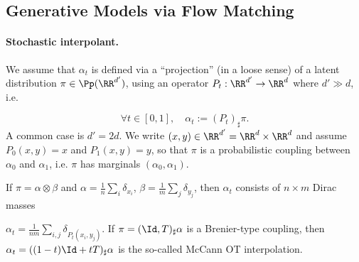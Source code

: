 \subsection{Generative Models via Flow Matching}
\paragraph{Stochastic interpolant.}
We assume that $\alpha_t$ is defined via a ``projection'' (in a loose sense) of a latent distribution $\pi \in \Pp(\RR^{d'})$, using an operator $P_t: \RR^{d'} \to \RR^d$ where $d' \gg d$, i.e.

\begin{equation}\label{eq:interp-coupling}
\forall t \in [0,1], \quad \alpha_t:= (P_t)_\sharp \pi.
\end{equation}
A common case is $d'=2d$. We write $(x,y) \in \RR^{d'} = \RR^d \times \RR^d$ and assume $P_0(x,y)=x$ and $P_1(x,y)=y$, so that $\pi$ is a probabilistic coupling between $\alpha_0$ and $\alpha_1$, i.e. $\pi$ has marginals $(\alpha_0, \alpha_1)$.

If $\pi = \alpha \otimes \beta$ and $\alpha = \frac{1}{n} \sum_i \delta_{x_i}$, $\beta = \frac{1}{m} \sum_j \delta_{y_j}$, then $\alpha_t$ consists of $n \times m$ Dirac masses

\(\alpha_t = \frac{1}{nm} \sum_{i,j} \delta_{P_t(x_i,y_j)}.\)
If $\pi = (\Id, T)_\sharp \alpha$ is a Brenier-type coupling, then $\alpha_t = ((1-t)\Id + tT)_\sharp \alpha$ is the so-called McCann OT interpolation.

